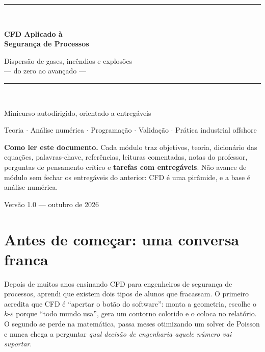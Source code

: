 \documentclass[10pt,a4paper,twocolumn,openany]{report}
\begin{document}
\begin{titlepage}
\centering
\vspace*{2cm}
{\color{azul}\rule{\linewidth}{1.5pt}}\\[0.6cm]
{\Huge\bfseries\color{azul} CFD Aplicado à\\[0.2cm] Segurança de Processos\par}
\vspace{0.4cm}
{\Large Dispersão de gases, incêndios e explosões\\ --- do zero ao avançado ---\par}
{\color{azul}\rule{\linewidth}{1.5pt}}\\[1.2cm]
{\large Minicurso autodirigido, orientado a entregáveis\par}
\vspace{0.6cm}
{\normalsize Teoria $\cdot$ Análise numérica $\cdot$ Programação $\cdot$
Validação $\cdot$ Prática industrial offshore\par}
\vfill
\begin{minipage}{0.8\linewidth}\small
\textcolor{azul}{\textbf{Como ler este documento.}} Cada módulo traz objetivos,
teoria, dicionário das equações, palavras-chave, referências, leituras
comentadas, notas do professor, perguntas de pensamento crítico e
\textbf{tarefas com entregáveis}. Não avance de módulo sem fechar os
entregáveis do anterior: CFD é uma pirâmide, e a base é análise numérica.
\end{minipage}
\vspace{1cm}
{\small Versão 1.0 --- outubro de 2026\par}
\end{titlepage}

\tableofcontents

\chapter*{Antes de começar: uma conversa franca}

Depois de muitos anos ensinando CFD para engenheiros de segurança de processos,
aprendi que existem dois tipos de alunos que fracassam. O primeiro acredita que
CFD é ``apertar o botão do software'': monta a geometria, escolhe o
$k$-$\varepsilon$ porque ``todo mundo usa'', gera um contorno colorido e o
coloca no relatório. O segundo se perde na matemática, passa meses
otimizando um solver de Poisson e nunca chega a perguntar \emph{qual decisão de
engenharia aquele número vai suportar}.
\end{document}
